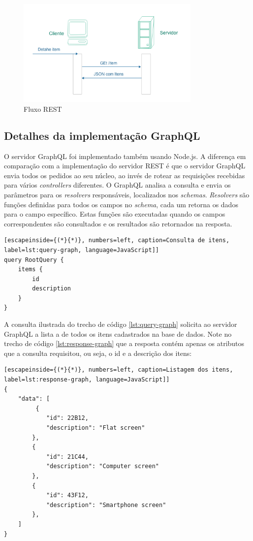 \begin{figure}[htbp]
\centering
\includegraphics[width=0.8\textwidth]{figuras/uml-rest.png}
\caption{Fluxo REST}
\label{fig:rest-uml}
\author{fonte: Autor}
\end{figure}

\subsection{Detalhes da implementação GraphQL}

O servidor GraphQL foi implementado também usando Node.js. A diferença em comparação com a implementação do servidor REST é que o servidor GraphQL envia todos os pedidos ao seu núcleo, ao invés de rotear as requisições recebidas para vários \textit{controllers} diferentes. O GraphQL analisa a consulta e envia os parâmetros para os \textit{resolvers} responsáveis, localizados nos \textit{schemas}. \textit{Resolvers} são funções definidas para todos os campos no \textit{schema}, cada um retorna os dados para o campo específico. Estas funções são executadas quando os campos correspondentes são consultados e os resultados são retornados na resposta.

\begin{lstlisting}[escapeinside={(*}{*)}, numbers=left, caption=Consulta de itens, label=lst:query-graph, language=JavaScript]]
query RootQuery {
	items {
    	id
    	description
    }
}

\end{lstlisting}

 A consulta ilustrada do trecho de código \ref{lst:query-graph} solicita ao servidor GraphQL a lista a de todos os itens cadastrados na base de dados. Note no trecho de código \ref{lst:response-graph} que a resposta contém apenas os atributos que a consulta requisitou, ou seja, o \textup{id} e a descrição dos itens:

\begin{lstlisting}[escapeinside={(*}{*)}, numbers=left, caption=Listagem dos itens, label=lst:response-graph, language=JavaScript]]
{
    "data": [
         {
            "id": 22B12,
            "description": "Flat screen"
        },
        {
            "id": 21C44,
            "description": "Computer screen"
        },
        {
            "id": 43F12,
            "description": "Smartphone screen"
        },
    ]
}

\end{lstlisting}

